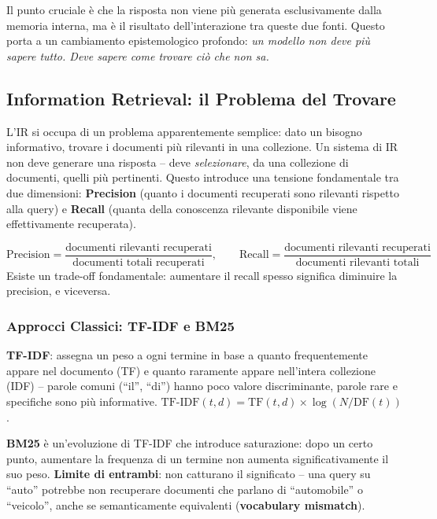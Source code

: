\documentclass[12pt,a4paper]{article}
\begin{document}
\begin{quizbox}
Il punto cruciale \`e che la risposta non viene pi\`u generata esclusivamente dalla memoria interna, ma \`e il risultato dell'interazione tra queste due fonti. Questo porta a un cambiamento epistemologico profondo: \emph{un modello non deve pi\`u sapere tutto. Deve sapere come trovare ci\`o che non sa.}
\end{quizbox}

\subsection{Information Retrieval: il Problema del Trovare}

L'IR si occupa di un problema apparentemente semplice: dato un bisogno informativo, trovare i documenti pi\`u rilevanti in una collezione. Un sistema di IR non deve generare una risposta -- deve \emph{selezionare}, da una collezione di documenti, quelli pi\`u pertinenti. Questo introduce una tensione fondamentale tra due dimensioni: \textbf{Precision} (quanto i documenti recuperati sono rilevanti rispetto alla query) e \textbf{Recall} (quanta della conoscenza rilevante disponibile viene effettivamente recuperata).

\begin{formulabox}
\[
\text{Precision} = \frac{\text{documenti rilevanti recuperati}}{\text{documenti totali recuperati}}, \qquad
\text{Recall} = \frac{\text{documenti rilevanti recuperati}}{\text{documenti rilevanti totali}}
\]
Esiste un trade-off fondamentale: aumentare il recall spesso significa diminuire la precision, e viceversa.
\end{formulabox}

\subsubsection{Approcci Classici: TF-IDF e BM25}

\textbf{TF-IDF}: assegna un peso a ogni termine in base a quanto frequentemente appare nel documento (TF) e quanto raramente appare nell'intera collezione (IDF) -- parole comuni (``il'', ``di'') hanno poco valore discriminante, parole rare e specifiche sono pi\`u informative. $\text{TF-IDF}(t,d) = \text{TF}(t,d) \times \log(N/\text{DF}(t))$.

\textbf{BM25} \`e un'evoluzione di TF-IDF che introduce saturazione: dopo un certo punto, aumentare la frequenza di un termine non aumenta significativamente il suo peso. \textbf{Limite di entrambi}: non catturano il significato -- una query su ``auto'' potrebbe non recuperare documenti che parlano di ``automobile'' o ``veicolo'', anche se semanticamente equivalenti (\textbf{vocabulary mismatch}).
\end{document}
